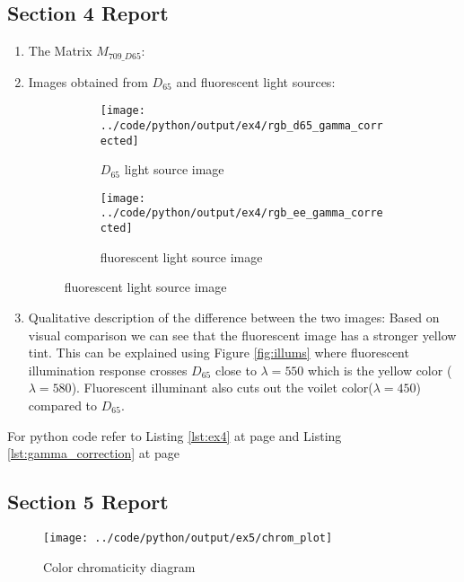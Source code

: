 \documentclass[a4paper,11pt]{article}
\newcommand{\reflst}[1]{Listing \ref{#1} at page \pageref{#1}}
\newcommand{\reffig}[1]{Figure \ref{#1}}
\begin{document}
%
\clearpage
\vspace{2ex}
\subsection*{Section 4 Report} 
\begin{enumerate}
 \item The Matrix $M_{709\_D65}$:
 
 
 \item Images obtained from $D_{65}$ and fluorescent light sources:
 \begin{figure}[!hp]
 \centering
 \begin{subfigure}{0.45\textwidth}
 \texttt{[image: ../code/python/output/ex4/rgb\_d65\_gamma\_corrected]}
 \caption{$D_{65}$ light source image}
 \end{subfigure}
%  
 \begin{subfigure}{0.45\textwidth}
 \texttt{[image: ../code/python/output/ex4/rgb\_ee\_gamma\_corrected]}
 \caption{fluorescent light source image}
 \end{subfigure}
\end{figure} 

 \item Qualitative description of the difference between the two images: Based on visual comparison we can see that the fluorescent image has a stronger yellow tint. This can be explained using \reffig{fig:illums} where fluorescent illumination response crosses $D_{65}$ close to $\lambda=550$ which is the yellow color ($\lambda=580$). Fluorescent illuminant also cuts out the voilet color($\lambda=450$) compared to $D_{65}$.

\end{enumerate}
For python code refer to \reflst{lst:ex4} and \reflst{lst:gamma_correction}

\clearpage
\vspace{2ex}
\subsection*{Section 5 Report} 
\begin{figure}[!hp]
  \centering
  \texttt{[image: ../code/python/output/ex5/chrom\_plot]}
  \caption{Color chromaticity diagram}
 \end{figure}
\end{document}
